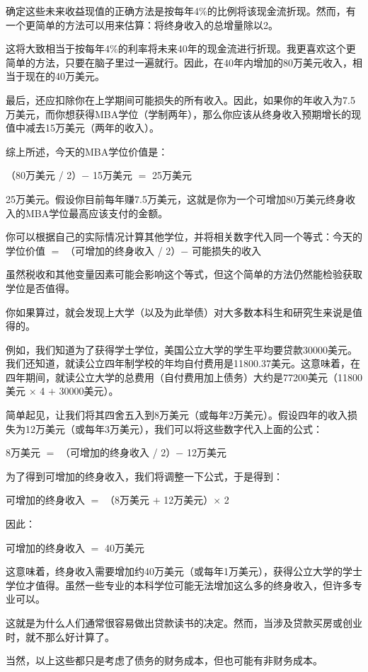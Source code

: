 确定这些未来收益现值的正确方法是按每年4\%的比例将该现金流折现。然而，有一个更简单的方法可以用来估算：将终身收入的总增量除以2。

这将大致相当于按每年4\%的利率将未来40年的现金流进行折现。我更喜欢这个更简单的方法，只要在脑子里过一遍就行。因此，在40年内增加的80万美元收入，相当于现在的40万美元。

最后，还应扣除你在上学期间可能损失的所有收入。因此，如果你的年收入为7.5万美元，而你想获得MBA学位（学制两年），那么你应该从终身收入预期增长的现值中减去15万美元（两年的收入）。

综上所述，今天的MBA学位价值是：

（80万美元 / 2）$-$ 15万美元 $=$ 25万美元

25万美元。假设你目前每年赚7.5万美元，这就是你为一个可增加80万美元终身收入的MBA学位最高应该支付的金额。

你可以根据自己的实际情况计算其他学位，并将相关数字代入同一个等式：今天的学位价值 $=$ （可增加的终身收入 / 2）$-$ 可能损失的收入

虽然税收和其他变量因素可能会影响这个等式，但这个简单的方法仍然能检验获取学位是否值得。

你如果算过，就会发现上大学（以及为此举债）对大多数本科生和研究生来说是值得的。

例如，我们知道为了获得学士学位，美国公立大学的学生平均要贷款30000美元。我们还知道，就读公立四年制学校的年均自付费用是11800.37美元。这意味着，在四年期间，就读公立大学的总费用（自付费用加上债务）大约是77200美元（11800美元 $\times$ 4 $+$ 30000美元）。

简单起见，让我们将其四舍五入到8万美元（或每年2万美元）。假设四年的收入损失为12万美元（或每年3万美元），我们可以将这些数字代入上面的公式：

8万美元 $=$ （可增加的终身收入 / 2）$-$ 12万美元

为了得到可增加的终身收入，我们将调整一下公式，于是得到：

可增加的终身收入 $=$ （8万美元 $+$ 12万美元）$\times$ 2

因此：

可增加的终身收入 $=$ 40万美元

这意味着，终身收入需要增加约40万美元（或每年1万美元），获得公立大学的学士学位才值得。虽然一些专业的本科学位可能无法增加这么多的终身收入，但许多专业可以。

这就是为什么人们通常很容易做出贷款读书的决定。然而，当涉及贷款买房或创业时，就不那么好计算了。

当然，以上这些都只是考虑了债务的财务成本，但也可能有非财务成本。

